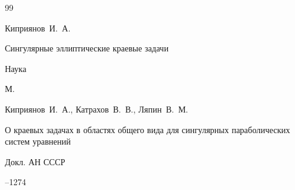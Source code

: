 \begin{thebibliography}{99}

\by Киприянов~И.~А.

\book Сингулярные эллиптические краевые задачи


\publ Наука

\publaddr М.















\by Киприянов~И.~А., Катрахов~В.~В., Ляпин~В.~М.

\paper О краевых задачах в областях общего вида для сингулярных параболических систем уравнений

\jour Докл. АН СССР




--1274














\end{thebibliography}
